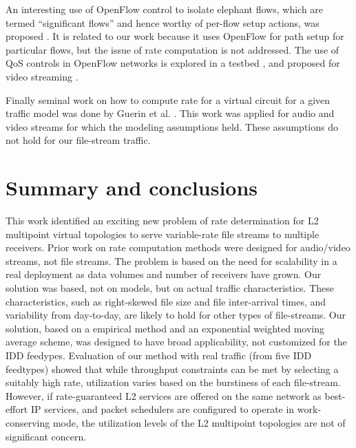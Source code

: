 An interesting use of OpenFlow control to isolate elephant flows, which are termed ``significant flows'' and hence worthy of per-flow setup actions, was proposed \cite{Curtis:2011:DSF:2018436.2018466}. It is related to our work because it uses OpenFlow for path setup for particular flows, but the issue of rate computation is not addressed.
The use of QoS controls in OpenFlow networks is explored in a testbed \cite{6385057}, and proposed for video streaming \cite{6116083}.

Finally seminal work on how to compute rate for a virtual circuit
for a given traffic model was done by Guerin et al. \cite{103545}.
This work was applied for audio and video streams for which the modeling
assumptions held. These assumptions do not hold for our file-stream traffic. 

\section{Summary and conclusions}
This work identified an exciting new problem
of rate determination for L2 multipoint virtual topologies
to serve variable-rate file streams to multiple receivers. Prior work
on rate computation methods were designed for audio/video
streams, not file streams. The problem is based on the need
for scalability in a real deployment as data volumes and
number of receivers have grown. Our solution was based, not
on models, but on actual traffic characteristics. These
characteristics, such as right-skewed file size and file
inter-arrival times, and variability from day-to-day,
are likely to hold for other types of file-streams. 
Our solution, based on a empirical method and an exponential weighted moving average scheme, was designed
to have broad applicability, not customized for the IDD feedypes.
Evaluation of our method with real traffic (from five IDD feedtypes) showed that
while throughput constraints can be met by selecting a suitably high
rate, utilization varies based on the burstiness of each file-stream.
However, if rate-guaranteed L2 services are offered
on the same network as best-effort IP services, and packet schedulers
are configured to operate in work-conserving mode, the utilization levels
of the L2 multipoint topologies are not of significant concern.
